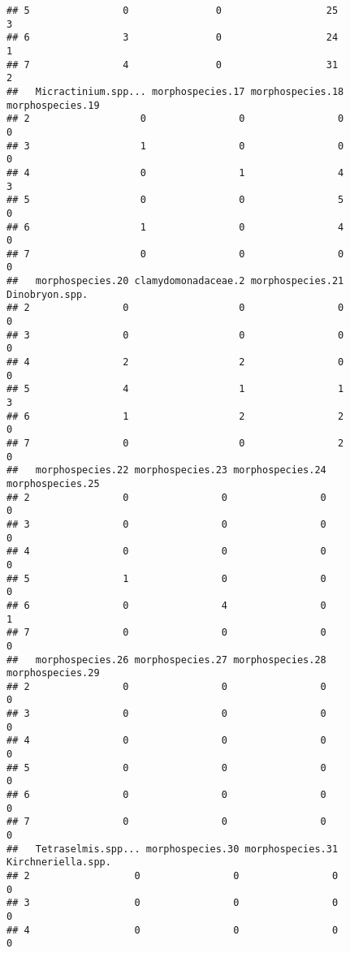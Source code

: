 \documentclass[]{article}
\begin{document}
\begin{verbatim}
## 5                0               0                  25                  3
## 6                3               0                  24                  1
## 7                4               0                  31                  2
##   Micractinium.spp... morphospecies.17 morphospecies.18 morphospecies.19
## 2                   0                0                0                0
## 3                   1                0                0                0
## 4                   0                1                4                3
## 5                   0                0                5                0
## 6                   1                0                4                0
## 7                   0                0                0                0
##   morphospecies.20 clamydomonadaceae.2 morphospecies.21 Dinobryon.spp.
## 2                0                   0                0              0
## 3                0                   0                0              0
## 4                2                   2                0              0
## 5                4                   1                1              3
## 6                1                   2                2              0
## 7                0                   0                2              0
##   morphospecies.22 morphospecies.23 morphospecies.24 morphospecies.25
## 2                0                0                0                0
## 3                0                0                0                0
## 4                0                0                0                0
## 5                1                0                0                0
## 6                0                4                0                1
## 7                0                0                0                0
##   morphospecies.26 morphospecies.27 morphospecies.28 morphospecies.29
## 2                0                0                0                0
## 3                0                0                0                0
## 4                0                0                0                0
## 5                0                0                0                0
## 6                0                0                0                0
## 7                0                0                0                0
##   Tetraselmis.spp... morphospecies.30 morphospecies.31 Kirchneriella.spp.
## 2                  0                0                0                  0
## 3                  0                0                0                  0
## 4                  0                0                0                  0

\end{verbatim}
\end{document}
